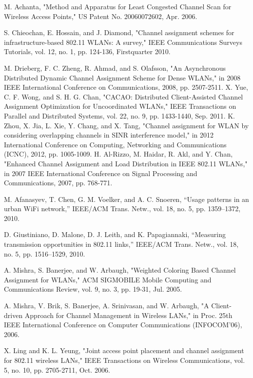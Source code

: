 \begin{thebibliography}{1}
 M. Achanta, "Method and Apparatus for Least Congested Channel Scan for Wireless Access Points," US Patent No. 20060072602, Apr. 2006.

 S. Chieochan, E. Hossain, and J. Diamond, "Channel assignment schemes for infrastructure-based 802.11 WLANs: A survey," IEEE Communications Surveys Tutorials, vol. 12, no. 1, pp. 124-136, Firstquarter 2010.

M. Drieberg, F. C. Zheng, R. Ahmad, and S. Olafsson, "An Asynchronous Distributed Dynamic Channel Assignment Scheme for Dense WLANs," in 2008 IEEE International Conference on Communications, 2008, pp. 2507-2511.
X. Yue, C. F. Wong, and S. H. G. Chan, "CACAO: Distributed Client-Assisted Channel Assignment Optimization for Uncoordinated WLANs," IEEE Transactions on Parallel and Distributed Systems, vol. 22, no. 9, pp. 1433-1440, Sep. 2011.
 K. Zhou, X. Jia, L. Xie, Y. Chang, and X. Tang, "Channel assignment for WLAN by considering overlapping channels in SINR interference model," in 2012 International Conference on Computing, Networking and Communications (ICNC), 2012, pp. 1005-1009.
 H. Al-Rizzo, M. Haidar, R. Akl, and Y. Chan, "Enhanced Channel Assignment and Load Distribution in IEEE 802.11 WLANs," in 2007 IEEE International Conference on Signal Processing and Communications, 2007, pp. 768-771.

 M. Afanasyev, T. Chen, G. M. Voelker, and A. C. Snoeren, “Usage patterns in an urban WiFi network,” IEEE/ACM Trans. Netw., vol. 18, no. 5, pp. 1359–1372, 2010.

 D. Giustiniano, D. Malone, D. J. Leith, and K. Papagiannaki, “Measuring transmission opportunities in 802.11 links,” IEEE/ACM Trans. Netw., vol. 18, no. 5, pp. 1516–1529, 2010.

 A. Mishra, S. Banerjee, and W. Arbaugh, "Weighted Coloring Based Channel Assignment for WLANs," ACM SIGMOBILE Mobile Computing and Communications Review, vol. 9, no. 3, pp. 19-31, Jul. 2005.

 A. Mishra, V. Brik, S. Banerjee, A. Srinivasan, and W. Arbaugh, "A Client-driven Approach for Channel Management in Wireless LANs," in Proc. 25th IEEE International Conference on Computer Communications (INFOCOM’06), 2006.

 X. Ling and K. L. Yeung, "Joint access point placement and channel assignment for 802.11 wireless LANs," IEEE Transactions on Wireless Communications, vol. 5, no. 10, pp. 2705-2711, Oct. 2006.


\end{thebibliography}
